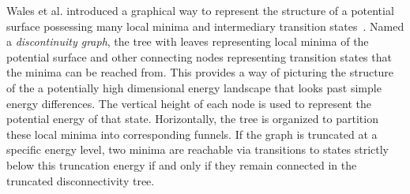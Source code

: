 






Wales et al. introduced a graphical way to represent the structure of a potential surface possessing many local minima and intermediary transition states~\cite{Wales1998, Doye1999}. Named a \textit{discontinuity graph}, the tree with leaves representing local minima of the potential surface and other connecting nodes representing transition states that the minima can be reached from. This provides a way of picturing the structure of the a potentially high dimensional energy landscape that looks past simple energy differences. The vertical height of each node is used to represent the potential energy of that state. Horizontally, the tree is organized to partition these local minima into corresponding funnels. If the graph is truncated at a specific energy level, two minima are reachable via transitions to states strictly below this truncation energy if and only if they remain connected in the truncated disconnectivity tree. 


